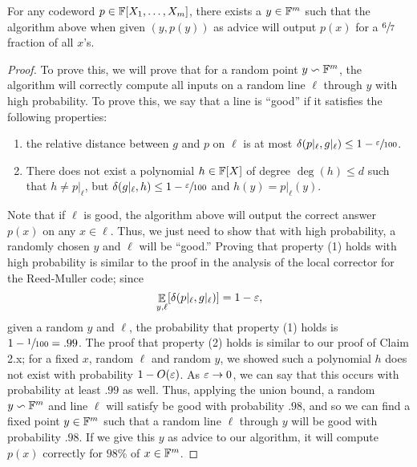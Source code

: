 \documentclass[11pt]{article}
\begin{document}
\begin{claim}{2.7}
    For any codeword $p \in \mathbb{F}[X_1, \ldots, X_m]$, there exists a $y \in \mathbb{F}^m$ such that the algorithm above when given $(y, p(y))$ as advice will output $p(x)$ for a $\sfrac{6}{7}$ fraction of all $x$'s.
\end{claim}

\begin{proof}
    To prove this, we will prove that for a random point $y \backsim \mathbb{F}^m$, the algorithm will correctly compute all inputs on a random line $\ell$ through $y$ with high probability. To prove this, we say that a line is ``good'' if it satisfies the following properties:
    \begin{enumerate}
        \item[(1)] the relative distance between $g$ and $p$ on $\ell$ is at most $\delta(p|_\ell, g|_\ell) \leq 1 - \sfrac{\varepsilon}{100}$.
        \item[(2)] There does not exist a polynomial $h \in \mathbb{F}[X]$ of degree $\deg (h) \leq d$ such that $h \neq p|_\ell$, but $\delta(g|_\ell, h) \leq 1 - \sfrac{\varepsilon}{100}$ and $h(y) = p|_\ell(y)$.
    \end{enumerate}
    Note that if $\ell$ is good, the algorithm above will output the correct answer $p(x)$ on any $x \in \ell$. Thus, we just need to show that with high probability, a randomly chosen $y$ and $\ell$ will be ``good.'' Proving that property (1) holds with high probability is similar to the proof in the analysis of the local corrector for the Reed-Muller code; since
    \begin{equation*}
        \mathop{\mathbb{E}}_{y, \ell}[\delta(p|_\ell, g|_\ell)] = 1 - \varepsilon,
    \end{equation*}
    given a random $y$ and $\ell$, the probability that property (1) holds is $1 - \sfrac{1}{100} = .99$. The proof that property (2) holds is similar to our proof of Claim 2.x; for a fixed $x$, random $\ell$ and random $y$, we showed such a polynomial $h$ does not exist with probability $1 - O(\varepsilon)$. As $\varepsilon \rightarrow 0$, we can say that this occurs with probability at least $.99$ as well. Thus, applying the union bound, a random $y \backsim \mathbb{F}^m$ and line $\ell$ will satisfy be good with probability $.98$, and so we can find a fixed point $y \in \mathbb{F}^m$ such that a random line $\ell$ through $y$ will be good with probability $.98$. If we give this $y$ as advice to our algorithm, it will compute $p(x)$ correctly for $98$\% of $x \in \mathbb{F}^m$. 
\end{proof}
\end{document}
